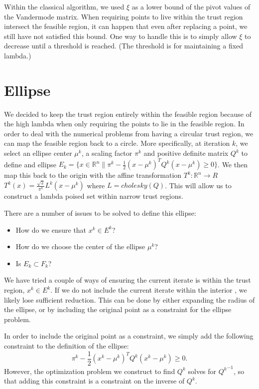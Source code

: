 \documentclass{article}
\begin{document}
Within the classical algorithm, we used $\xi$ as a lower bound of the pivot values of the Vandermode matrix.
When requiring points to live within the trust region intersect the feasible region, it can happen that even after replacing a point, we still have not satisfied this bound.
One way to handle this is to simply allow $\xi$ to decrease until a threshold is reached.
(The threshold is for maintaining a fixed lambda.)


    
\section{Ellipse}


We decided to keep the trust region entirely within the feasible region because of the high lambda when only requiring the points to lie in the feasible region.
In order to deal with the numerical problems from having a circular trust region, we can map the feasible region back to a circle.
More specifically, at iteration $k$, we select an ellipse center $\mu^k$, a scaling factor $\pi^k$ and positive definite matrix $Q^k$ to define and ellipse
$E_k = \{x \in \mathbb R^n \| \pi^k - \frac 1 2 (x - \mu^{k})^TQ^{k}(x - \mu^{k}) \ge 0 \}$.
We then map this back to the origin with the affine transformation $T^k : \mathbb R^n \to R$ $T^k(x) = \frac {\sqrt{2}}{\pi^k} L^k(x-\mu^k)$ where $L = cholesky(Q)$.
This will allow us to construct a lambda poised set within narrow trust regions.

There are a number of issues to be solved to define this ellipse:
\begin{itemize}
\item How do we ensure that $x^k \in E^k$?
\item How do we choose the center of the ellipse $\mu^k$?
\item Is $E_k \subset F_k$?
\end{itemize}

We have tried a couple of ways of ensuring the current iterate is within the trust region, $x^k \in E^k$.
If we do not include the current iterate \color{red} within the interior \color{black}, we likely lose sufficient reduction.
This can be done by either expanding the radius of the ellipse, or by including the original point as a constraint for the ellipse problem.


In order to include the original point as a constraint, we simply add the following constraint to the definition of the ellipse:
$$ \pi^k - \frac 1 2 (x^k - \mu^{k})^TQ^{k}(x^k - \mu^{k}) \ge 0. $$
However, the optimization problem we construct to find $Q^k$ solves for ${Q^k}^{-1}$, so that adding this constraint is a constraint on the inverse of $Q^k$.
\end{document}
